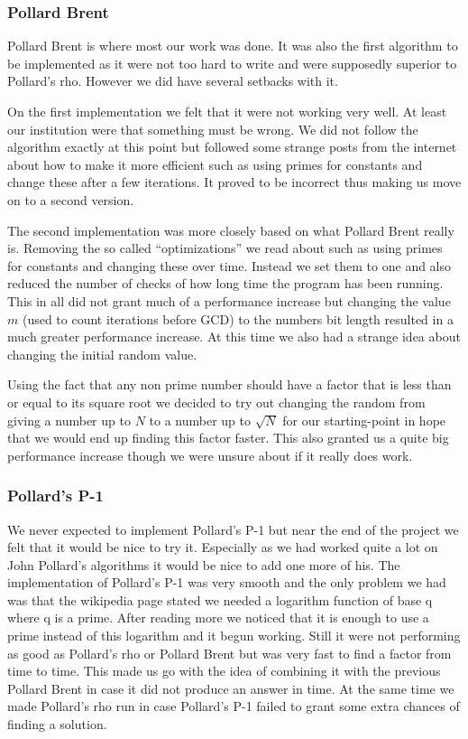 \subsubsection{Pollard Brent}

Pollard Brent is where most our work was done. It was also the first algorithm to be implemented as it were not too hard to write and were supposedly superior to Pollard's rho. However we did have several setbacks with it.

On the first implementation we felt that it were not working very well. At least our institution were that something must be wrong. We did not follow the algorithm exactly at this point but followed some strange posts from the internet about how to make it more efficient such as using primes for constants and change these after a few iterations. It proved to be incorrect thus making us move on to a second version.

The second implementation was more closely based on what Pollard Brent really is. Removing the so called “optimizations” we read about such as using primes for constants and changing these over time. Instead we set them to one and also reduced the number of checks of how long time the program has been running. This in all did not grant much of a performance increase but changing the value $m$ (used to count iterations before GCD) to the numbers bit length resulted in a much greater performance increase. At this time we also had a strange idea about changing the initial random value.

Using the fact that any non prime number should have a factor that is less than or equal to its square root we decided to try out changing the random from giving a number up to $N$ to a number up to $\sqrt{N}$ for our starting-point in hope that we would end up finding this factor faster. This also granted us a quite big performance increase though we were unsure about if it really does work.

\subsubsection{Pollard's P-1}

We never expected to implement Pollard's P-1 but near the end of the project we felt that it would be nice to try it. Especially as we had worked quite a lot on John Pollard's algorithms it would be nice to add one more of his.
The implementation of Pollard's P-1 was very smooth and the only problem we had was that the wikipedia page stated we needed a logarithm function of base q where q is a prime. After reading more we noticed that it is enough to use a prime instead of this logarithm and it begun working. Still it were not performing as good as Pollard's rho or Pollard Brent but was very fast to find a factor from time to time. This made us go with the idea of combining it with the previous Pollard Brent in case it did not produce an answer in time. At the same time we made Pollard's rho run in case Pollard's P-1 failed to grant some extra chances of finding a solution.
